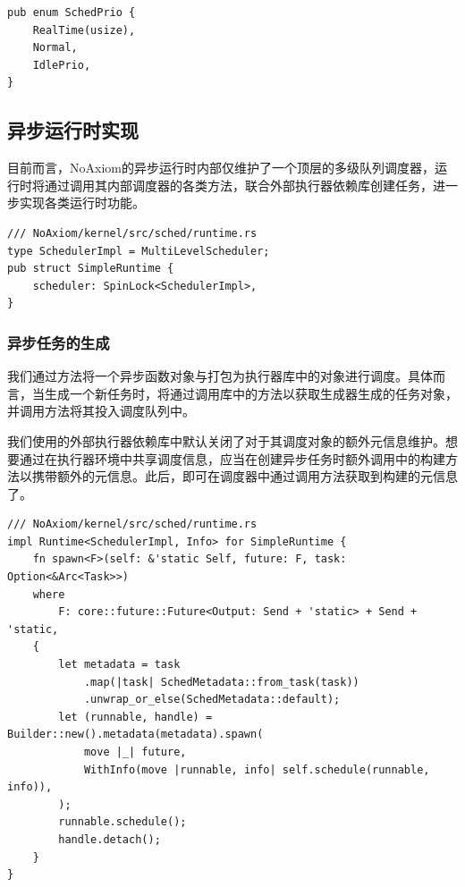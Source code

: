 \documentclass{article}
\begin{document}
\begin{lstlisting}
pub enum SchedPrio {
    RealTime(usize),
    Normal,
    IdlePrio,
}
\end{lstlisting}

\subsection{异步运行时实现}

目前而言，NoAxiom的异步运行时内部仅维护了一个顶层的多级队列调度器，运行时将通过调用其内部调度器的各类方法，联合外部执行器依赖库创建任务，进一步实现各类运行时功能。

\begin{lstlisting}
/// NoAxiom/kernel/src/sched/runtime.rs
type SchedulerImpl = MultiLevelScheduler;
pub struct SimpleRuntime {
    scheduler: SpinLock<SchedulerImpl>,
}
\end{lstlisting}

\subsubsection{异步任务的生成}

我们通过方法将一个异步函数对象与打包为执行器库中的对象进行调度。具体而言，当生成一个新任务时，将通过调用库中的方法以获取生成器生成的任务对象，并调用方法将其投入调度队列中。

我们使用的外部执行器依赖库中默认关闭了对于其调度对象的额外元信息维护。想要通过在执行器环境中共享调度信息，应当在创建异步任务时额外调用中的构建方法以携带额外的元信息。此后，即可在调度器中通过调用方法获取到构建的元信息了。

\begin{lstlisting}
/// NoAxiom/kernel/src/sched/runtime.rs
impl Runtime<SchedulerImpl, Info> for SimpleRuntime {
    fn spawn<F>(self: &'static Self, future: F, task: Option<&Arc<Task>>)
    where
        F: core::future::Future<Output: Send + 'static> + Send + 'static,
    {
        let metadata = task
            .map(|task| SchedMetadata::from_task(task))
            .unwrap_or_else(SchedMetadata::default);
        let (runnable, handle) = Builder::new().metadata(metadata).spawn(
            move |_| future,
            WithInfo(move |runnable, info| self.schedule(runnable, info)),
        );
        runnable.schedule();
        handle.detach();
    }
}
\end{lstlisting}
\end{document}
